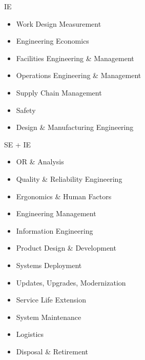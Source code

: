 \documentclass[letterpaper,10pt,english]{jupyterBook}
\begin{document}
\sphinxAtStartPar
IE
\begin{itemize}
\item {} 
\sphinxAtStartPar
Work Design  Measurement

\item {} 
\sphinxAtStartPar
Engineering Economics

\item {} 
\sphinxAtStartPar
Facilities Engineering \& Management

\item {} 
\sphinxAtStartPar
Operations Engineering \& Management

\item {} 
\sphinxAtStartPar
Supply Chain Management

\item {} 
\sphinxAtStartPar
Safety

\item {} 
\sphinxAtStartPar
Design \& Manufacturing Engineering

\end{itemize}

\sphinxAtStartPar
SE + IE
\begin{itemize}
\item {} 
\sphinxAtStartPar
OR \& Analysis

\item {} 
\sphinxAtStartPar
Quality \& Reliability Engineering

\item {} 
\sphinxAtStartPar
Ergonomics \& Human Factors

\item {} 
\sphinxAtStartPar
Engineering Management

\item {} 
\sphinxAtStartPar
Information Engineering

\item {} 
\sphinxAtStartPar
Product Design \& Development

\item {} 
\sphinxAtStartPar
Systems Deployment

\item {} 
\sphinxAtStartPar
Updates, Upgrades, Modernization

\item {} 
\sphinxAtStartPar
Service Life Extension

\item {} 
\sphinxAtStartPar
System Maintenance

\item {} 
\sphinxAtStartPar
Logistics

\item {} 
\sphinxAtStartPar
Disposal \& Retirement

\end{itemize}
\end{document}
